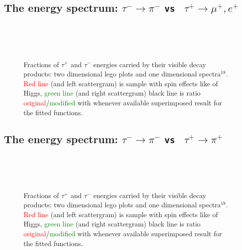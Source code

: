 \newpage
\subsection{The energy spectrum: $\tau^- \to \pi^-$ {\tt vs } $\tau^+ \to \mu^+, e^+$}
\vspace{1\baselineskip}

\begin{figure}[h!]
\centering
{}
 \\
 \\
 \\
\caption{\small Fractions of  $\tau^+$ and $\tau^-$ energies carried by their visible  decay products:
two dimensional lego plots and one dimensional spectra$^{18}$.
\textcolor{red}{Red line} (and left scattergram) is sample with spin effects like of Higgs,
\textcolor{green}{green line} (and right scattergram) \greenlineis
black line is ratio \textcolor{red}{original}/\textcolor{green}{modified} with whenever available superimposed result for the
fitted functions.
}
\end{figure}

\newpage
\subsection{The energy spectrum: $\tau^- \to \pi^-$ {\tt vs } $\tau^+ \to \pi^+$}
\vspace{1\baselineskip}

\begin{figure}[h!]
\centering
{}
 \\
 \\
 \\
\caption{\small Fractions of  $\tau^+$ and $\tau^-$ energies carried by their visible  decay products:
two dimensional lego plots and one dimensional spectra$^{18}$.
\textcolor{red}{Red line} (and left scattergram) is sample with spin effects like of Higgs,
\textcolor{green}{green line} (and right scattergram) \greenlineis
black line is ratio \textcolor{red}{original}/\textcolor{green}{modified} with whenever available superimposed result for the
fitted functions.
}\label{Fig:scattergrams2}
\end{figure}

